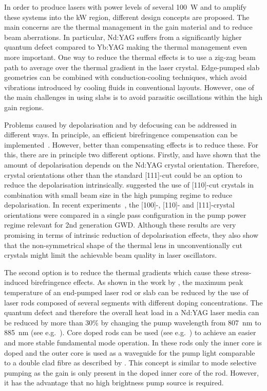 In order to produce lasers with power levels of several 100~W and to amplify these systems into the kW region, different design concepts are proposed. The main concerns are the thermal management in the gain material and to reduce beam aberrations. In particular, Nd:YAG suffers from a significantly higher quantum defect compared to Yb:YAG making the thermal management even more important. One way to reduce the thermal effects is to use a zig-zag beam path to average over the thermal gradient in the laser crystal. Edge-pumped slab geometries can be combined with conduction-cooling techniques, which avoid vibrations introduced by cooling fluids in conventional layouts. However, one of the main challenges in using slabs is to avoid parasitic oscillations within the high gain regions.

Problems caused by depolarisation and by defocusing can be addressed in different ways. In principle, an efficient birefringence compensation can be implemented~\cite{Lue1996}. However, better than compensating effects is to reduce these. For this, there are in principle two different options. Firstly, \citet{Koechner1971} and \citet{Soms1980} have shown that the amount of depolarisation depends on the Nd:YAG crystal orientation. Therefore, crystal orientations other than the standard [111]-cut could be an option to reduce the depolarisation intrinsically. \citet{Shoji2002} suggested the use of [110]-cut crystals in combination with small beam size in the high pumping regime to reduce depolarisation. In recent experiments~\cite{Puncken2010}, the [100]-, [110]- and [111]-crystal orientations were compared in a single pass configuration in the pump power regime relevant for 2nd generation GWD. Although these results are very promising in terms of intrinsic reduction of depolarisation effects, they also show that the non-symmetrical shape of the thermal lens in unconventionally cut crystals might limit the achievable beam quality in laser oscillators.

The second option is to reduce the thermal gradients which cause these stress-induced birefringence effects. As shown in the work by \citet{Wilhelm2009,Wilhelm2010}, the maximum peak temperature of an end-pumped laser rod or slab can be reduced by the use of laser rods composed of several segments with different doping concentrations. 
The quantum defect and therefore the overall heat load in a Nd:YAG laser media can be reduced by more than 30\% by changing the pump wavelength from 807~nm to 885~nm (see e.g.~\cite{Lavi2000,Frede2006}).
Core doped rods can be used (see e.g.~\cite{Kracht2006}) to achieve an easier and more stable fundamental mode operation.
In these rods only the inner core is doped and the outer core is used as a waveguide for the pump light comparable to a double clad fibre as described by \citet{Bedoe1993}. This concept is similar to mode selective pumping as the gain is only present in the doped inner core of the rod. However, it has the advantage that no high brightness pump source is required.

